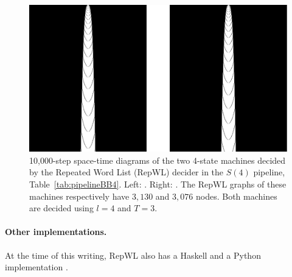 \begin{figure}
    \centering
    \includegraphics[scale=0.48]{figures/RepWL/RepWL_BB4_two_machines.pdf}
    \caption{10,000-step space-time diagrams of the two 4-state machines decided by the Repeated Word List (RepWL) decider in the $S(4)$ pipeline, Table~\ref{tab:pipelineBB4}. Left: {\small {}}. Right: {\small {}}. The RepWL graphs of these machines respectively have $3{,}130$ and $3{,}076$ nodes. Both machines are decided using $l=4$ and $T=3$.
    }\label{fig:RepWLBB4}
\end{figure}

\paragraph{Other implementations.} At the time of this writing, RepWL also has a Haskell and a Python implementation \cite{RepWL_haskell,RepWL_python}.